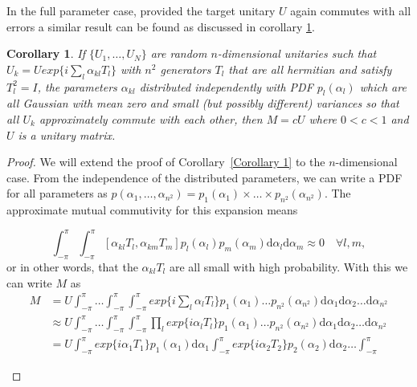 \documentclass[aps,pra,twocolumn,superscriptaddress,numerical,floatfix]{revtex4-1}
\newtheorem{corollary}{Corollary}
\begin{document}
In the full parameter case, provided the target unitary $U$ again commutes with all errors a similar result can be found as discussed in corollary \ref{Corollary 2}.

\begin{corollary}
\label{Corollary 2}
If $\{U_1,\ldots,U_N\}$ are random $n$-dimensional unitaries such that $U_k = U exp\{i \sum_l \alpha_{kl} T_l\}$ with $n^2$ generators $T_l$ that are all hermitian and satisfy $T_l^2=I$, the parameters $\alpha_{kl}$ distributed independently with PDF $p_{l}(\alpha_l)$ which are all Gaussian with mean zero and small (but possibly different) variances so that all $U_k$ approximately commute with each other, then $M = c U$ where $0 < c < 1$ and $U$ is a unitary matrix.
\end{corollary}
\begin{proof}
We will extend the proof of Corollary~\ref{Corollary 1} to the $n$-dimensional case.  From the independence of the distributed parameters, we can write a PDF for all parameters as $p(\alpha_1,\ldots,\alpha_{n^{2}}) = p_1(\alpha_1)\times\ldots\times p_{n^2}(\alpha_{n^{2}})$.  
The approximate mutual commutivity for this expansion means 
\begin{widetext}
\newcommand{\theint}{\int^\pi_{-\pi} \ldots \int^\pi_{-\pi} \int^\pi_{-\pi}}
\newcommand{\theintd}{\mathrm{d}\alpha_1 \mathrm{d}\alpha_2 \ldots \mathrm{d}\alpha_{n^{2}}}
\begin{equation}
	\int^\pi_{-\pi} \int^\pi_{-\pi}
	[\alpha_{kl}T_{l},\alpha_{km}T_{m}] p_l(\alpha_l)p_m(\alpha_m) \mathrm{d}\alpha_l \mathrm{d}\alpha_m \approx 0 \quad \forall l,m,
\end{equation}
or in other words, that the $\alpha_{kl}T_l$ are all small with high probability.  With this we can write $M$ as
\begin{align}
	M &= U \theint
	exp\{i \sum_l \alpha_{l} T_l\} p_1(\alpha_1)\ldots p_{n^2}(\alpha_{n^{2}})
	\theintd
	\label{eq:general integral form} \\
	&\approx U \theint
	\prod_{l}exp\{i \alpha_{l} T_l\}p_1(\alpha_1)\ldots p_{n^2}(\alpha_{n^{2}})
	\theintd  \\
	&= U\int^\pi_{-\pi} exp\{i \alpha_{1} T_1\}p_1(\alpha_1) \mathrm{d}\alpha_1 	\int^\pi_{-\pi} exp\{i \alpha_{2} T_2\}p_2(\alpha_2) \mathrm{d}\alpha_2 \ldots \int^\pi_{-\pi}

\end{align}
\end{widetext}
\end{proof}
\end{document}
